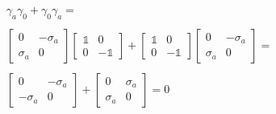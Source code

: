 \begin{equation}
  \begin{array}{c}
    \gamma_a\gamma_0 + \gamma_0\gamma_a =
    \\

    \\
    \begin{bmatrix}
      0 & -\sigma_a\\
      \sigma_a & 0
    \end{bmatrix}\begin{bmatrix}
      \mathbb{1} & 0\\
      0 & -\mathbb{1}
    \end{bmatrix} +
    \begin{bmatrix}
      \mathbb{1} & 0\\
      0 & -\mathbb{1}
    \end{bmatrix}\begin{bmatrix}
      0 & -\sigma_a\\
      \sigma_a & 0
    \end{bmatrix} =
    \\

    \\
    \begin{bmatrix}
      0 & -\sigma_a\\
      -\sigma_a & 0
    \end{bmatrix} +
    \begin{bmatrix}
      0 & \sigma_a\\
      \sigma_a & 0
    \end{bmatrix} = 0
  \end{array}
\end{equation}

